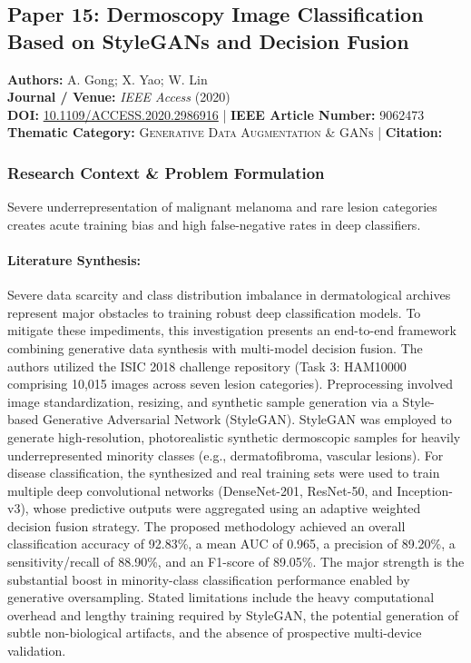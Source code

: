 \subsection{Paper 15: Dermoscopy Image Classification Based on StyleGANs and Decision Fusion}
\label{sec:paper_15}

\begin{tcolorbox}[colback=gray!5!white,colframe=gray!75!black,title=\textbf{Metadata \& Citation Summary}]
\textbf{Authors:} A. Gong; X. Yao; W. Lin \\
\textbf{Journal / Venue:} \textit{IEEE Access} (2020) \\
\textbf{DOI:} \href{https://doi.org/10.1109/ACCESS.2020.2986916}{10.1109/ACCESS.2020.2986916} \quad | \quad \textbf{IEEE Article Number:} 9062473 \\
\textbf{Thematic Category:} \textsc{Generative Data Augmentation \& GANs} \quad | \quad \textbf{Citation:} \cite{9062473}
\end{tcolorbox}

\subsubsection*{Research Context \& Problem Formulation}
Severe underrepresentation of malignant melanoma and rare lesion categories creates acute training bias and high false-negative rates in deep classifiers.

\paragraph{Literature Synthesis:} Severe data scarcity and class distribution imbalance in dermatological archives represent major obstacles to training robust deep classification models. To mitigate these impediments, this investigation presents an end-to-end framework combining generative data synthesis with multi-model decision fusion. The authors utilized the ISIC 2018 challenge repository (Task 3: HAM10000 comprising 10,015 images across seven lesion categories). Preprocessing involved image standardization, resizing, and synthetic sample generation via a Style-based Generative Adversarial Network (StyleGAN). StyleGAN was employed to generate high-resolution, photorealistic synthetic dermoscopic samples for heavily underrepresented minority classes (e.g., dermatofibroma, vascular lesions). For disease classification, the synthesized and real training sets were used to train multiple deep convolutional networks (DenseNet-201, ResNet-50, and Inception-v3), whose predictive outputs were aggregated using an adaptive weighted decision fusion strategy. The proposed methodology achieved an overall classification accuracy of 92.83\%, a mean AUC of 0.965, a precision of 89.20\%, a sensitivity/recall of 88.90\%, and an F1-score of 89.05\%. The major strength is the substantial boost in minority-class classification performance enabled by generative oversampling. Stated limitations include the heavy computational overhead and lengthy training required by StyleGAN, the potential generation of subtle non-biological artifacts, and the absence of prospective multi-device validation.

